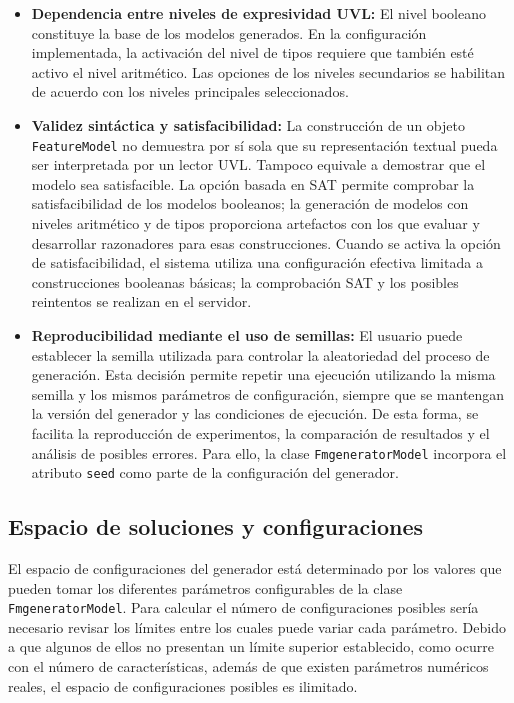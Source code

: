 \begin{itemize}
    \item \textbf{Dependencia entre niveles de expresividad UVL:} El nivel
    booleano constituye la base de los modelos generados. En la configuración
    implementada, la activación del nivel de tipos requiere que también esté
    activo el nivel aritmético. Las opciones de los niveles secundarios se
    habilitan de acuerdo con los niveles principales seleccionados.

    \item \textbf{Validez sintáctica y satisfacibilidad:} La construcción de
    un objeto \texttt{FeatureModel} no demuestra por sí sola que su
    representación textual pueda ser interpretada por un lector UVL. Tampoco
    equivale a demostrar que el modelo sea satisfacible. La opción basada en SAT
    permite comprobar la satisfacibilidad de los modelos booleanos; la
    generación de modelos con niveles aritmético y de tipos proporciona
    artefactos con los que evaluar y desarrollar razonadores para esas
    construcciones. Cuando se activa la opción de satisfacibilidad, el sistema
    utiliza una configuración efectiva limitada a construcciones booleanas
    básicas; la comprobación SAT y los posibles reintentos se realizan en el
    servidor.

    \item \textbf{Reproducibilidad mediante el uso de semillas:} El usuario puede establecer la semilla utilizada para controlar la aleatoriedad del proceso de generación. Esta decisión permite repetir una ejecución utilizando la misma semilla y los mismos parámetros de configuración, siempre que se mantengan la versión del generador y las condiciones de ejecución. De esta forma, se facilita la reproducción de experimentos, la comparación de resultados y el análisis de posibles errores. Para ello, la clase \texttt{FmgeneratorModel} incorpora el atributo \texttt{seed} como parte de la configuración del generador.
\end{itemize}

\subsection{Espacio de soluciones y configuraciones}
\label{subsec:espacio_soluciones}


El espacio de configuraciones del generador está determinado por los valores que pueden tomar los diferentes parámetros configurables de la clase \texttt{FmgeneratorModel}. Para calcular el número de configuraciones posibles sería necesario revisar los límites entre los cuales puede variar cada parámetro. Debido a que algunos de ellos no presentan un límite superior establecido, como ocurre con el número de características, además de que existen parámetros numéricos reales, el espacio de configuraciones posibles es ilimitado.

